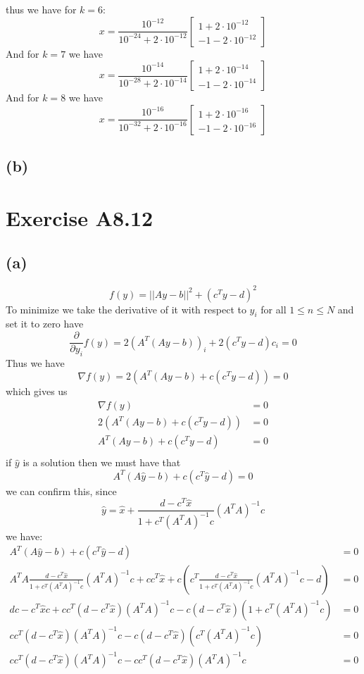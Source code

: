 thus we have for $k=6$:
$$x=\frac{10^{-12}}{10^{-24}+2\cdot10^{-12}}\begin{bmatrix}
    1+2\cdot10^{-12}\\
    -1-2\cdot10^{-12}
\end{bmatrix}$$
And for $k=7$ we have
$$x=\frac{10^{-14}}{10^{-28}+2\cdot10^{-14}}\begin{bmatrix}
    1+2\cdot10^{-14}\\
    -1-2\cdot10^{-14}
\end{bmatrix}$$
And for $k=8$ we have
$$x=\frac{10^{-16}}{10^{-32}+2\cdot10^{-16}}\begin{bmatrix}
    1+2\cdot10^{-16}\\
    -1-2\cdot10^{-16}
\end{bmatrix}$$
\subsection*{(b)}

\section*{Exercise A8.12}
\subsection*{(a)}
$$f(y)=||Ay-b||^2+(c^Ty-d)^2$$
To minimize we take the derivative of it with respect to $y_i$ for all
$1\leq n \leq N$ and set it to zero have
$$\frac{\partial}{\partial y_i} f(y)=2(A^T(Ay-b))_i+2(c^Ty-d)c_i=0$$
Thus we have 
$$\nabla f(y)=2(A^T(Ay-b)+c(c^Ty-d))=0$$
which gives us
\begin{align*}
    \nabla f(y)&=0\\
    2(A^T(Ay-b)+c(c^Ty-d))&=0\\
    A^T(Ay-b)+c(c^Ty-d)&=0\\
\end{align*}
if $\hat{y}$ is a solution then we must have that
$$A^T(A\hat{y}-b)+c(c^T\hat{y}-d)=0$$
we can confirm this, since 
$$\hat{y}=\hat{x}+\frac{d-c^T\hat{x}}{1+c^T(A^TA)^{-1}c}(A^TA)^{-1}c$$
we have:
\begin{align*}
    A^T(A\hat{y}-b)+c(c^T\hat{y}-d)&=0\\
    A^TA\frac{d-c^T\hat{x}}{1+c^T(A^TA)^{-1}c}(A^TA)^{-1}c+cc^T\hat{x}+c(c^T\frac{d-c^T\hat{x}}{1+c^T(A^TA)^{-1}c}(A^TA)^{-1}c-d)&=0\\
    dc-c^T\hat{x}c+cc^T(d-c^T\hat{x})(A^TA)^{-1}c-c(d-c^T\hat{x})(1+c^T(A^TA)^{-1}c)&=0\\
    cc^T(d-c^T\hat{x})(A^TA)^{-1}c-c(d-c^T\hat{x})(c^T(A^TA)^{-1}c)&=0\\
    cc^T(d-c^T\hat{x})(A^TA)^{-1}c-cc^T(d-c^T\hat{x})(A^TA)^{-1}c&=0
\end{align*}
